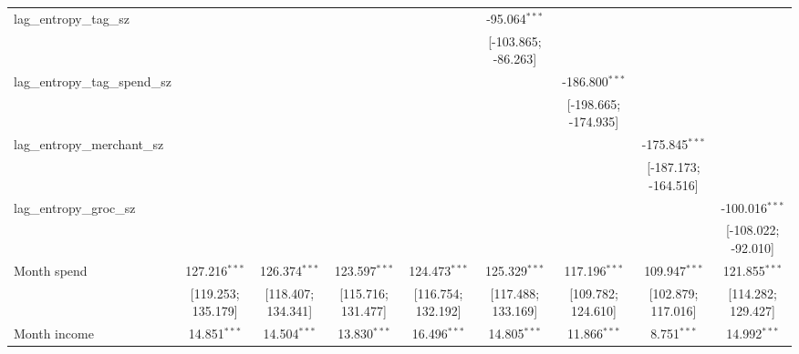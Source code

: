 \begin{table}[htbp]
\begin{threeparttable}[b]
\begin{tabular}{lcccccccc}
         lag\_entropy\_tag\_sz            &                    &                    &                    &                    & -95.064$^{***}$     &                      &                      &   \\   
                                          &                    &                    &                    &                    & [-103.865; -86.263] &                      &                      &   \\   
         lag\_entropy\_tag\_spend\_sz     &                    &                    &                    &                    &                     & -186.800$^{***}$     &                      &   \\   
                                          &                    &                    &                    &                    &                     & [-198.665; -174.935] &                      &   \\   
         lag\_entropy\_merchant\_sz       &                    &                    &                    &                    &                     &                      & -175.845$^{***}$     &   \\   
                                          &                    &                    &                    &                    &                     &                      & [-187.173; -164.516] &   \\   
         lag\_entropy\_groc\_sz           &                    &                    &                    &                    &                     &                      &                      & -100.016$^{***}$\\   
                                          &                    &                    &                    &                    &                     &                      &                      & [-108.022; -92.010]\\   
         Month spend                      & 127.216$^{***}$    & 126.374$^{***}$    & 123.597$^{***}$    & 124.473$^{***}$    & 125.329$^{***}$     & 117.196$^{***}$      & 109.947$^{***}$      & 121.855$^{***}$\\   
                                          & [119.253; 135.179] & [118.407; 134.341] & [115.716; 131.477] & [116.754; 132.192] & [117.488; 133.169]  & [109.782; 124.610]   & [102.879; 117.016]   & [114.282; 129.427]\\   
         Month income                     & 14.851$^{***}$     & 14.504$^{***}$     & 13.830$^{***}$     & 16.496$^{***}$     & 14.805$^{***}$      & 11.866$^{***}$       & 8.751$^{***}$        & 14.992$^{***}$\\   

\end{tabular}
\end{threeparttable}
\end{table}
